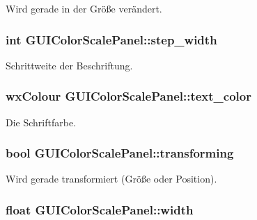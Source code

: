 Wird gerade in der Größe verändert. \hypertarget{classGUIColorScalePanel_a5f9789cc727854594c7d29c392578427}{
\subsubsection[{step\-\_\-width}]{\setlength{\rightskip}{0pt plus 5cm}int G\-U\-I\-Color\-Scale\-Panel\-::step\-\_\-width\hspace{0.3cm}{\ttfamily [private]}}}\label{classGUIColorScalePanel_a5f9789cc727854594c7d29c392578427}
Schrittweite der Beschriftung. \hypertarget{classGUIColorScalePanel_a48e282e7a3bfff30894e9e6edfd120dc}{
\subsubsection[{text\-\_\-color}]{\setlength{\rightskip}{0pt plus 5cm}wx\-Colour G\-U\-I\-Color\-Scale\-Panel\-::text\-\_\-color\hspace{0.3cm}{\ttfamily [private]}}}\label{classGUIColorScalePanel_a48e282e7a3bfff30894e9e6edfd120dc}
Die Schriftfarbe. \hypertarget{classGUIColorScalePanel_a3330450ed906fb99f56ed825d53f69e1}{
\subsubsection[{transforming}]{\setlength{\rightskip}{0pt plus 5cm}bool G\-U\-I\-Color\-Scale\-Panel\-::transforming\hspace{0.3cm}{\ttfamily [private]}}}\label{classGUIColorScalePanel_a3330450ed906fb99f56ed825d53f69e1}
Wird gerade transformiert (Größe oder Position). \hypertarget{classGUIColorScalePanel_a1bc7bdf89d2447cddd08f5ae5f6638fa}{
\subsubsection[{width}]{\setlength{\rightskip}{0pt plus 5cm}float G\-U\-I\-Color\-Scale\-Panel\-::width\hspace{0.3cm}{\ttfamily [private]}}}\label{classGUIColorScalePanel_a1bc7bdf89d2447cddd08f5ae5f6638fa}
